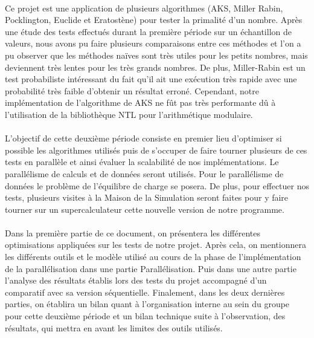 	\paragraph{}Ce projet est une application de plusieurs algorithmes (AKS, Miller Rabin, Pocklington, Euclide et Eratostène) pour tester la primalité d'un nombre. Après une étude des tests effectués durant la première période sur un échantillon de valeurs, nous avons pu faire plusieurs comparaisons entre ces méthodes et l'on a pu observer que les méthodes naïves sont très utiles pour les petits nombres, mais deviennent très lentes pour les très grands nombres. De plus, Miller-Rabin est un test probabiliste intéressant du fait qu'il ait une exécution très rapide avec une probabilité très faible d'obtenir un résultat erroné. Cependant, notre implémentation de l'algorithme de AKS ne fût pas très performante dû à l'utilisation de la bibliothèque NTL pour l'arithmétique modulaire.
	
	\paragraph{}L'objectif de cette deuxième période consiste en premier lieu d'optimiser si possible les algorithmes utilisés puis de s’occuper de faire tourner plusieurs de ces tests en parallèle et ainsi évaluer la scalabilité de nos implémentations. Le parallélisme de calculs et de données seront utilisés. Pour le parallélisme de données le problème de l'équilibre de charge se posera. De plus, pour effectuer nos tests, plusieurs visites à la Maison de la Simulation seront faites pour y faire tourner sur un supercalculateur cette nouvelle version de notre programme. 
	
	\paragraph{}Dans la première partie de ce document, on présentera les différentes optimisations appliquées sur les tests de notre projet.
	Après cela, on mentionnera les différents outils et le modèle utilisé au cours de la phase de l'implémentation de la parallélisation dans une partie Parallélisation. Puis dans une autre partie l'analyse des résultats établis lors des tests du projet accompagné d'un comparatif avec sa version séquentielle.
	Finalement, dans les deux dernières parties, on établira un bilan quant à l'organisation interne au sein du groupe pour cette deuxième période et un bilan technique suite à l'observation, des résultats, qui mettra en avant les limites des outils utilisés.
	
